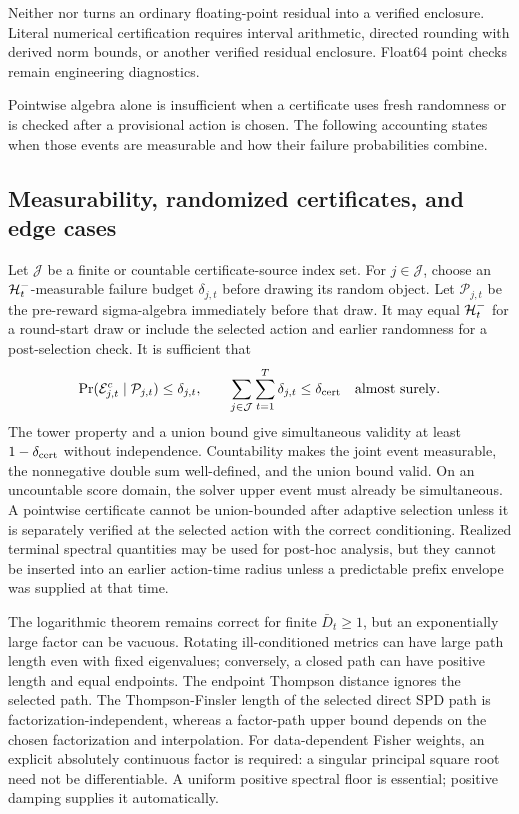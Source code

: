 Neither  nor
 turns an ordinary floating-point residual into a
verified enclosure.  Literal numerical certification requires interval
arithmetic, directed rounding with derived norm bounds, or another verified
residual enclosure.  Float64 point checks remain engineering diagnostics.

Pointwise algebra alone is insufficient when a certificate uses fresh
randomness or is checked after a provisional action is chosen.  The following
accounting states when those events are measurable and how their failure
probabilities combine.

\subsection{Measurability, randomized certificates, and edge cases}

Let $\mathcal J$ be a finite or countable certificate-source index set.  For
$j\in\mathcal J$, choose an $\mathcal{H}_t^-$-measurable failure budget
$\delta_{j,t}$ before drawing its random object.  Let $\mathcal P_{j,t}$ be the
pre-reward sigma-algebra immediately before that draw.  It may equal
$\mathcal{H}_t^-$ for a round-start draw or include the selected action and earlier
randomness for a post-selection check.  It is sufficient that
\[
 \Pr(\mathcal E_{j,t}^c\mid\mathcal P_{j,t})\le\delta_{j,t},
 \qquad
 \sum_{j\in\mathcal J}\sum_{t=1}^T\delta_{j,t}
 \le\delta_{\rm cert}\quad\text{almost surely}.
\]
The tower property and a union bound give simultaneous validity at least
$1-\delta_{\rm cert}$ without independence.  Countability makes the joint
event measurable, the nonnegative double sum well-defined, and the union bound
valid.  On an uncountable score domain,
the solver upper event must already be simultaneous.  A pointwise certificate
cannot be union-bounded after adaptive selection unless it is separately
verified at the selected action with the correct conditioning.
Realized terminal spectral quantities may be used for post-hoc analysis, but
they cannot be inserted into an earlier action-time radius unless a predictable
prefix envelope was supplied at that time.

The logarithmic theorem remains correct for finite $\bar D_t\ge1$, but an
exponentially large factor can be vacuous.  Rotating ill-conditioned metrics
can have large path length even with fixed eigenvalues; conversely, a closed
path can have positive length and equal endpoints.  The endpoint Thompson
distance ignores the selected path.  The Thompson-Finsler length of the
selected direct SPD path is factorization-independent, whereas a factor-path
upper bound depends on the chosen factorization and interpolation.
For data-dependent Fisher weights, an explicit absolutely continuous factor is
required: a singular principal square root need not be differentiable.  A
uniform positive spectral floor is essential; positive damping supplies it
automatically.



